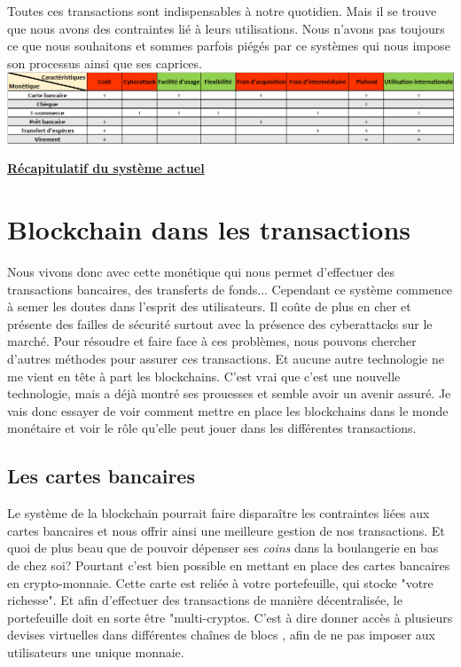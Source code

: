 \documentclass[12pt]{report}
\begin{document}
\hspace{1cm} Toutes ces transactions sont indispensables à notre quotidien. Mais il se trouve que nous avons des contraintes lié à leurs utilisations. Nous n'avons pas toujours ce que nous souhaitons et sommes parfois piégés par ce systèmes qui nous impose son processus ainsi que ses caprices.\\

\includegraphics[width=1\textwidth]{tableau_recap}
\begin{center}
   \textbf{\underline{Récapitulatif du système actuel}} \\[1cm]
\end{center}


\newpage
\section{Blockchain dans les transactions}

\hspace{1cm} Nous vivons donc avec cette monétique qui nous permet d'effectuer des transactions bancaires, des transferts de fonds... Cependant ce système commence à semer les doutes dans l'esprit des utilisateurs. Il coûte de plus en cher et présente des failles de sécurité surtout avec la présence des cyberattacks sur le marché. Pour résoudre et faire face à ces problèmes, nous pouvons chercher d'autres méthodes pour assurer ces transactions. Et aucune autre technologie ne me vient en tête à part les blockchains. C'est vrai que c'est une nouvelle technologie, mais a déjà montré ses prouesses et semble avoir un avenir assuré. Je vais donc essayer de voir comment mettre en place les blockchains dans le monde monétaire et voir le rôle qu'elle peut jouer dans les différentes transactions.


    \subsection{Les cartes bancaires}

\hspace{1cm} Le système de la blockchain pourrait faire disparaître les contraintes liées aux cartes bancaires et nous offrir ainsi une meilleure gestion de nos transactions. Et quoi de plus beau que de pouvoir dépenser ses \textit{coins} dans la boulangerie en bas de chez soi? Pourtant c'est bien possible en mettant en place des cartes bancaires en crypto-monnaie. Cette carte est reliée à votre portefeuille, qui stocke "votre richesse". Et afin d'effectuer des transactions de manière décentralisée, le portefeuille doit en sorte être "multi-cryptos. C'est à dire donner accès à plusieurs devises virtuelles dans différentes chaînes de blocs , afin de ne pas imposer aux utilisateurs une unique monnaie. \\
\end{document}
